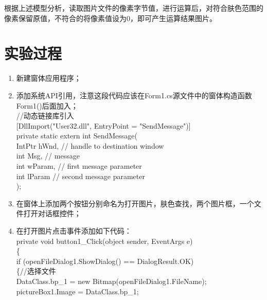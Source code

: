 ﻿\documentclass[12pt,a4paper,oneside]{book}
\begin{document}
根据上述模型分析，读取图片文件的像素字节值，进行运算后，对符合肤色范围的像素保留原值，不符合的将像素值设为0，即可产生运算结果图片。


\section{实验过程} 
\begin{enumerate}
\item 新建窗体应用程序；
\item 添加系统API引用，注意这段代码应该在Form1.cs源文件中的窗体构造函数Form1()后面加入；\\
\hspace*{2em}//动态链接库引入\\
\hspace*{2em}[DllImport("User32.dll", EntryPoint = "SendMessage")]\\
\hspace*{2em}private static extern int SendMessage(\\
\hspace*{2em}IntPtr hWnd, // handle to destination window \\
\hspace*{2em}int Msg, // message \\
\hspace*{2em}int wParam, // first message parameter \\
\hspace*{2em}int lParam // second message parameter \\
\hspace*{2em});\\
\item 在窗体上添加两个按钮分别命名为打开图片，肤色查找，两个图片框，一个文件打开对话框控件；
\item 在打开图片点击事件添加如下代码：\\
\hspace*{0em}private void button1\_Click(object sender, EventArgs e)\\
\hspace*{0em}\{\\
\hspace*{2em}if (openFileDialog1.ShowDialog() == DialogResult.OK)\\
\hspace*{2em}\{//选择文件\\
\hspace*{4em}DataClass.bp\_1 = new Bitmap(openFileDialog1.FileName);\\
\hspace*{4em}pictureBox1.Image = DataClass.bp\_1;\\

\end{enumerate}
\end{document}
